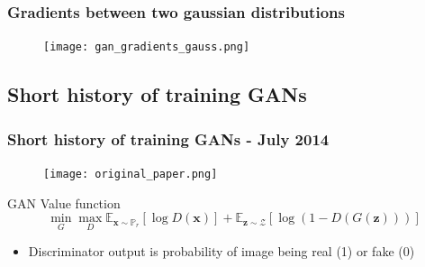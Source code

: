 \documentclass{Bredelebeamer}
\begin{document}
\begin{frame}
	\frametitle{Gradients between two gaussian distributions}
	\begin{figure}[h!]
		\centering
		\texttt{[image: gan\_gradients\_gauss.png]}
	\end{figure}
\end{frame}

\subsection{Short history of training GANs}
\begin{frame}
	\frametitle{Short history of training GANs - July 2014}
	\begin{figure}[h!]
		\centering
		\texttt{[image: original\_paper.png]}
	\end{figure}
	\pause
	\begin{exampleblock}{GAN Value function}
	\[
		\min_G \max_D \mathbb{E}_{\bm{x} \sim \mathbb{P}_r} \left[ \log D(\bm{x}) \right] + \mathbb{E}_{\bm{z} \sim \mathcal{Z}} \left[ \log (1 -  D(G(\bm{z})))  \right] 
	\]
	\end{exampleblock}
	\begin{itemize}
		\item Discriminator output is probability of image being real (1) or fake (0)
	\end{itemize}
\end{frame}
\end{document}
